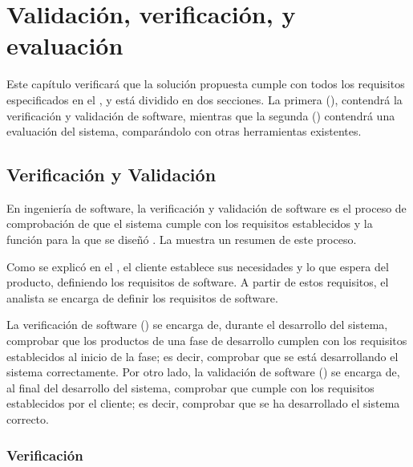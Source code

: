 \chapter{Validación, verificación, y evaluación}\label{chap:validation}

Este capítulo verificará que la solución propuesta cumple con todos los
requisitos especificados en el , y está dividido en dos
secciones. La primera (), contendrá la verificación y
validación de software, mientras que la segunda ()
contendrá una evaluación del sistema, comparándolo con otras herramientas
existentes.

\section{Verificación y Validación}\label{sec:tests}

En ingeniería de software, la verificación y validación de software es el
proceso de comprobación de que el sistema cumple con los requisitos establecidos
y la función para la que se diseñó \parencite{verification-validation}. La
 muestra un resumen de este proceso.


Como se explicó en el , el cliente establece sus
necesidades y lo que espera del producto, definiendo los requisitos de software.
A partir de estos requisitos, el analista se encarga de definir los requisitos
de software.

La verificación de software () se encarga de,
durante el desarrollo del sistema, comprobar que los productos de una fase de
desarrollo cumplen con los requisitos establecidos al inicio de la fase; es
decir, comprobar que se está desarrollando el sistema correctamente. Por otro
lado, la validación de software () se encarga de, al
final del desarrollo del sistema, comprobar que cumple con los requisitos
establecidos por el cliente; es decir, comprobar que se ha desarrollado el
sistema correcto. \parencite{verification-validation}

\printtesttemplate

\subsection{Verificación}\label{subsec:verification}

